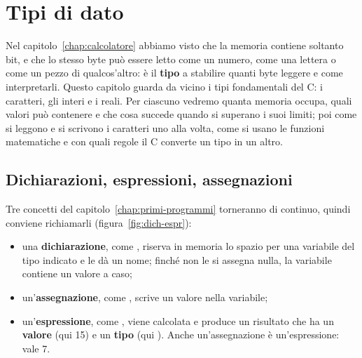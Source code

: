 \chapter{Tipi di dato}
\label{chap:tipi}

Nel capitolo~\ref{chap:calcolatore} abbiamo visto che la memoria contiene
soltanto bit, e che lo stesso byte può essere letto come un numero, come una
lettera o come un pezzo di qualcos'altro: è il \textbf{tipo} a stabilire
quanti byte leggere e come interpretarli. Questo capitolo guarda da vicino i
tipi fondamentali del C: i caratteri, gli interi e i reali. Per ciascuno
vedremo quanta memoria occupa, quali valori può contenere e che cosa succede
quando si superano i suoi limiti; poi come si leggono e si scrivono i
caratteri uno alla volta, come si usano le funzioni matematiche e con quali
regole il C converte un tipo in un altro.

\section{Dichiarazioni, espressioni, assegnazioni}

Tre concetti del capitolo~\ref{chap:primi-programmi} torneranno di
continuo, quindi conviene richiamarli (figura~\ref{fig:dich-espr}):

\begin{itemize}
  \item una \textbf{dichiarazione}, come , riserva in memoria lo
        spazio per una variabile del tipo indicato e le dà un nome; finché
        non le si assegna nulla, la variabile contiene un valore a caso;
  \item un'\textbf{assegnazione}, come , scrive un valore nella
        variabile;
  \item un'\textbf{espressione}, come , viene calcolata e
        produce un risultato che ha un \textbf{valore} (qui 15) e un
        \textbf{tipo} (qui ). Anche un'assegnazione è
        un'espressione:  vale 7.
\end{itemize}

